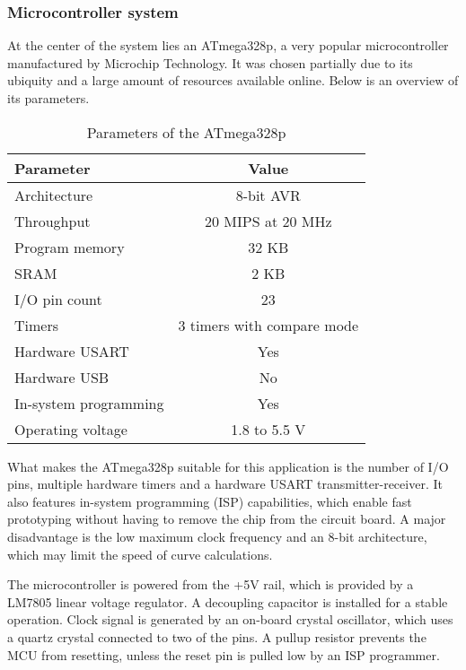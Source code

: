 \subsubsection{Microcontroller system}

At the center of the system lies an ATmega328p, a very popular microcontroller
manufactured by Microchip Technology. It was chosen partially due to its
ubiquity and a large amount of resources available online. Below is an overview
of its parameters.

\begin{table}[ht]
    \begin{center}
        \begin{tabular}{ |l|c| }
            \hline
            Parameter & Value \\
            \hline
            Architecture & 8-bit AVR \\
            Throughput & 20 MIPS at 20 MHz \\
            Program memory & 32 KB \\
            SRAM & 2 KB \\
            I/O pin count & 23 \\
            Timers & 3 timers with compare mode \\
            Hardware USART & Yes \\
            Hardware USB & No \\
            In-system programming & Yes \\
            Operating voltage & 1.8 to 5.5 V \\
            \hline
        \end{tabular}
        \caption{Parameters of the ATmega328p \cite{atmega328p}}
    \end{center}
\end{table}

What makes the ATmega328p suitable for this application is the number of I/O
pins, multiple hardware timers and a hardware USART transmitter-receiver.
It also features in-system programming (ISP) capabilities, which enable fast
prototyping without having to remove the chip from the circuit board. A major
disadvantage is the low maximum clock frequency and an 8-bit architecture, which
may limit the speed of curve calculations.

The microcontroller is powered from the +5V rail, which is provided by a LM7805
linear voltage regulator. A decoupling capacitor is installed for a stable
operation. Clock signal is generated by an on-board crystal oscillator, which
uses a quartz crystal connected to two of the pins. A pullup resistor prevents
the MCU from resetting, unless the reset pin is pulled low by an ISP programmer.

